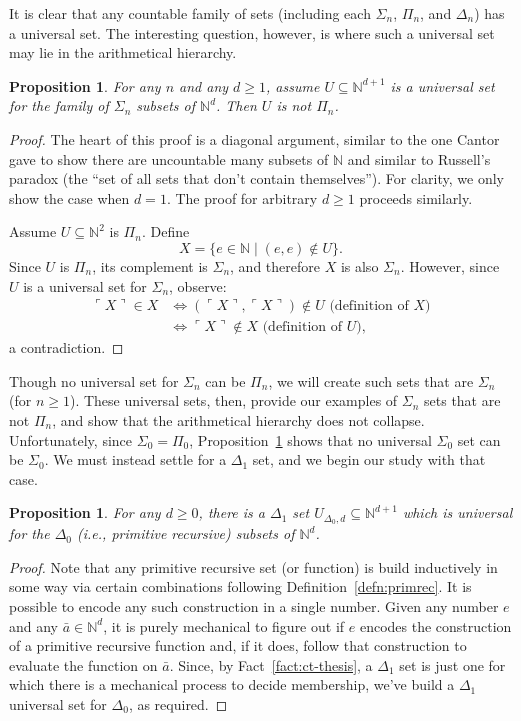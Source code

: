 \documentclass{article}
\theoremstyle{plain}
\newtheorem{prop}[thm]{Proposition}
\theoremstyle{definition}
\newcommand{\tuple}{\bar}
\newcommand{\lgnum}{\ulcorner}
\newcommand{\rgnum}{\urcorner}
\begin{document}
It is clear that any countable family of sets (including each
$\Sigma_n$, $\Pi_n$, and $\Delta_n$) has a universal set. The
interesting question, however, is where such a universal set may lie
in the arithmetical hierarchy.

\begin{prop}\label{prop:univ-sign-not-pin}
  For any $n$ and any $d \geq 1$, assume $U \subseteq
  \mathbb{N}^{d+1}$ is a universal set for the family of $\Sigma_n$
  subsets of $\mathbb{N}^d$. Then $U$ is not $\Pi_n$.
\end{prop}
\begin{proof}
  The heart of this proof is a diagonal argument, similar to the one
  Cantor gave to show there are uncountable many subsets of
  $\mathbb{N}$ and similar to Russell's paradox (the ``set of all sets
  that don't contain themselves''). For clarity, we only show the case
  when $d = 1$. The proof for arbitrary $d \geq 1$ proceeds similarly.

  Assume $U \subseteq \mathbb{N}^2$ is $\Pi_n$. Define $$X = \{e \in
  \mathbb{N} \mid (e,e) \not\in U\}\text{.}$$ Since $U$ is $\Pi_n$,
  its complement is $\Sigma_n$, and therefore $X$ is also
  $\Sigma_n$. However, since $U$ is a universal set for $\Sigma_n$,
  observe:
  \begin{align*}
    \lgnum X \rgnum \in X
    &\iff (\lgnum X \rgnum, \lgnum X \rgnum) \not\in U \text{ (definition of } X \text{)} \\
    &\iff \lgnum X \rgnum \not\in X \text{ (definition of } U \text{),}
  \end{align*}
  a contradiction.
\end{proof}

Though no universal set for $\Sigma_n$ can be $\Pi_n$, we will create
such sets that are $\Sigma_n$ (for $n \geq 1$). These universal sets,
then, provide our examples of $\Sigma_n$ sets that are not $\Pi_n$,
and show that the arithmetical hierarchy does not
collapse. Unfortunately, since $\Sigma_0 = \Pi_0$,
Proposition~\ref{prop:univ-sign-not-pin} shows that no universal
$\Sigma_0$ set can be $\Sigma_0$. We must instead settle for a
$\Delta_1$ set, and we begin our study with that case.

\begin{prop}
  For any $d \geq 0$, there is a $\Delta_1$ set $U_{\Delta_0,d}
  \subseteq \mathbb{N}^{d+1}$ which is universal for the $\Delta_0$
  (i.e., primitive recursive) subsets of $\mathbb{N}^d$.
\end{prop}
\begin{proof}
  Note that any primitive recursive set (or function) is build
  inductively in some way via certain combinations following
  Definition~\ref{defn:primrec}. It is possible to encode any such
  construction in a single number. Given any number $e$ and any
  $\tuple{a} \in \mathbb{N}^d$, it is purely mechanical to figure out
  if $e$ encodes the construction of a primitive recursive function
  and, if it does, follow that construction to evaluate the function
  on $\tuple{a}$. Since, by Fact~\ref{fact:ct-thesis}, a $\Delta_1$
  set is just one for which there is a mechanical process to decide
  membership, we've build a $\Delta_1$ universal set for $\Delta_0$,
  as required.
\end{proof}
\end{document}
